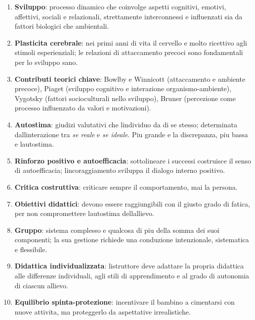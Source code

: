 \documentclass[a4paper,11pt]{article}
\begin{document}
\begin{enumerate}
      \item
            \textbf{Sviluppo}: processo dinamico che coinvolge aspetti cognitivi,
            emotivi, affettivi, sociali e relazionali, strettamente interconnessi
            e influenzati sia da fattori biologici che ambientali.
      \item
            \textbf{Plasticita cerebrale}: nei primi anni di vita il cervello e
            molto ricettivo agli stimoli esperienziali; le relazioni di
            attaccamento precoci sono fondamentali per lo sviluppo sano.
      \item
            \textbf{Contributi teorici chiave}: Bowlby e Winnicott (attaccamento e
            ambiente precoce), Piaget (sviluppo cognitivo e interazione
            organismo-ambiente), Vygotsky (fattori socioculturali nello sviluppo),
            Bruner (percezione come processo influenzato da valori e motivazioni).
      \item
            \textbf{Autostima}: giudizi valutativi che l\textquotesingle individuo
            da di se stesso; determinata dall\textquotesingle interazione tra
            \emph{se reale} e \emph{se ideale}. Piu grande e la discrepanza, piu
            bassa e l\textquotesingle autostima.
      \item
            \textbf{Rinforzo positivo e autoefficacia}: sottolineare i successi
            costruisce il senso di autoefficacia;
            l\textquotesingle incoraggiamento sviluppa il dialogo interno
            positivo.
      \item
            \textbf{Critica costruttiva}: criticare sempre il comportamento, mai
            la persona.
      \item
            \textbf{Obiettivi didattici}: devono essere raggiungibili con il
            giusto grado di fatica, per non compromettere
            l\textquotesingle autostima dell\textquotesingle allievo.
      \item
            \textbf{Gruppo}: sistema complesso e qualcosa di piu della somma dei
            suoi componenti; la sua gestione richiede una conduzione intenzionale,
            sistematica e flessibile.
      \item
            \textbf{Didattica individualizzata}: l\textquotesingle istruttore deve
            adattare la propria didattica alle differenze individuali, agli stili
            di apprendimento e al grado di autonomia di ciascun allievo.
      \item
            \textbf{Equilibrio spinta-protezione}: incentivare il bambino a
            cimentarsi con nuove attivita, ma proteggerlo da aspettative
            irrealistiche.
\end{enumerate}
\end{document}

